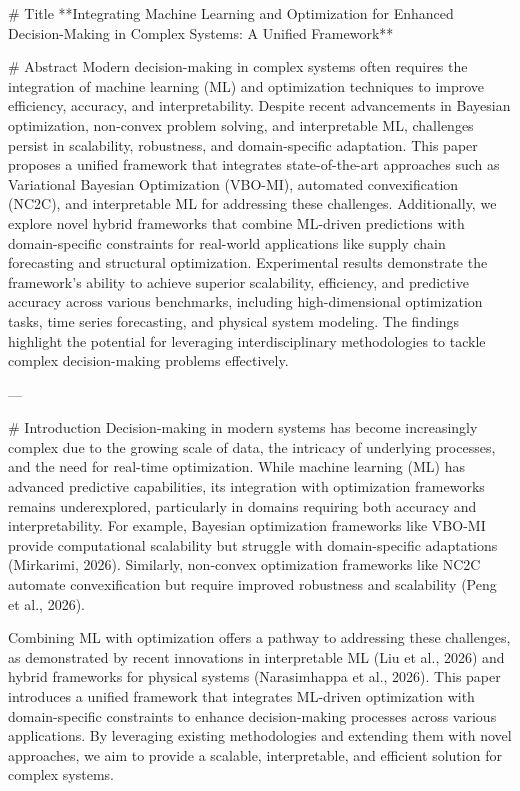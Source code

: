 # Title  
**Integrating Machine Learning and Optimization for Enhanced Decision-Making in Complex Systems: A Unified Framework**

# Abstract  
Modern decision-making in complex systems often requires the integration of machine learning (ML) and optimization techniques to improve efficiency, accuracy, and interpretability. Despite recent advancements in Bayesian optimization, non-convex problem solving, and interpretable ML, challenges persist in scalability, robustness, and domain-specific adaptation. This paper proposes a unified framework that integrates state-of-the-art approaches such as Variational Bayesian Optimization (VBO-MI), automated convexification (NC2C), and interpretable ML for addressing these challenges. Additionally, we explore novel hybrid frameworks that combine ML-driven predictions with domain-specific constraints for real-world applications like supply chain forecasting and structural optimization. Experimental results demonstrate the framework's ability to achieve superior scalability, efficiency, and predictive accuracy across various benchmarks, including high-dimensional optimization tasks, time series forecasting, and physical system modeling. The findings highlight the potential for leveraging interdisciplinary methodologies to tackle complex decision-making problems effectively.

---

# Introduction  
Decision-making in modern systems has become increasingly complex due to the growing scale of data, the intricacy of underlying processes, and the need for real-time optimization. While machine learning (ML) has advanced predictive capabilities, its integration with optimization frameworks remains underexplored, particularly in domains requiring both accuracy and interpretability. For example, Bayesian optimization frameworks like VBO-MI provide computational scalability but struggle with domain-specific adaptations (Mirkarimi, 2026). Similarly, non-convex optimization frameworks like NC2C automate convexification but require improved robustness and scalability (Peng et al., 2026). 

Combining ML with optimization offers a pathway to addressing these challenges, as demonstrated by recent innovations in interpretable ML (Liu et al., 2026) and hybrid frameworks for physical systems (Narasimhappa et al., 2026). This paper introduces a unified framework that integrates ML-driven optimization with domain-specific constraints to enhance decision-making processes across various applications. By leveraging existing methodologies and extending them with novel approaches, we aim to provide a scalable, interpretable, and efficient solution for complex systems.

